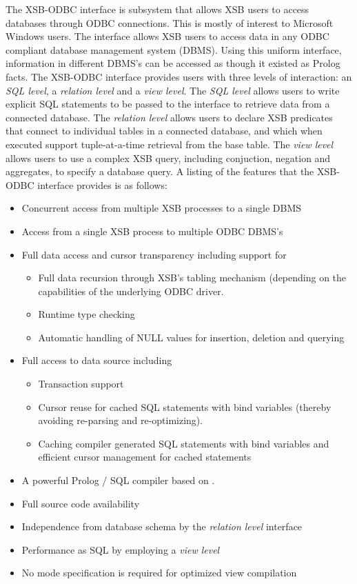 The XSB-ODBC interface is subsystem that allows XSB users to access
databases through ODBC connections.  This is mostly of interest to
Microsoft Windows users.  The interface allows XSB users to access
data in any ODBC compliant database management system (DBMS). Using
this uniform interface, information in different DBMS's can be
accessed as though it existed as Prolog facts. The XSB-ODBC interface
provides users with three levels of interaction: an {\it SQL level}, a
{\it relation level} and a {\it view level}.  The {\it SQL level}
allows users to write explicit SQL statements to be passed to the
interface to retrieve data from a connected database.  The {\it
relation level} allows users to declare XSB predicates that connect to
individual tables in a connected database, and which when executed
support tuple-at-a-time retrieval from the base table.  The {\it view
level} allows users to use a complex XSB query, including conjuction,
negation and aggregates, to specify a database query.  A listing of
the features that the XSB-ODBC interface provides is as follows:
\begin{itemize} 
\item Concurrent access from multiple XSB processes to a single DBMS
\item Access from a single XSB process to multiple ODBC DBMS's
\item Full data access and cursor transparency including support for
        \begin{itemize}
        \item Full data recursion through XSB's tabling mechanism 
        (depending on the capabilities of the underlying ODBC driver.
        \item Runtime type checking
        \item Automatic handling of NULL values for insertion, 
                deletion and querying
        \end{itemize}
\item Full access to data source including
        \begin{itemize}
        \item Transaction support
        \item Cursor reuse for cached SQL statements 
                with bind variables (thereby avoiding re-parsing and 
                re-optimizing).
        \item Caching compiler generated SQL statements with bind variables 
                and efficient cursor management for cached statements
        \end{itemize}
\item A powerful Prolog / SQL compiler based on \cite{Drax92}.
\item Full source code availability
\item Independence from database schema by the {\it relation level} interface
\item Performance as SQL by employing a {\it view level} 
\item No mode specification is required for optimized view compilation
\end{itemize}

